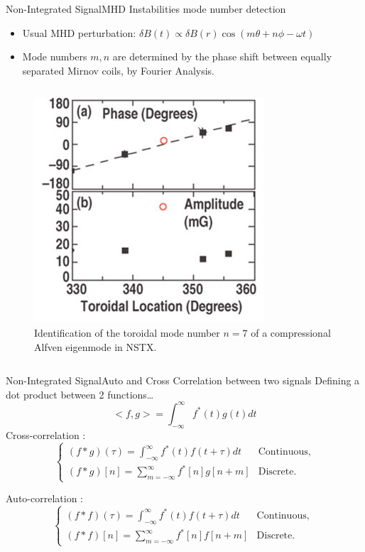 \documentclass{beamer}
\begin{document}
\begin{frame}{Non-Integrated Signal}{MHD Instabilities mode number detection}
 \begin{itemize}
	\item Usual MHD perturbation: $\delta B(t) \propto \delta B(r) \cos (m\theta + n\phi -\omega t ) $
		 \item Mode numbers {\color{red}  $m, n$}  are determined by the phase shift between equally separated Mirnov coils, by Fourier Analysis.
	 \end{itemize}
	 \begin{columns}
		 \begin{figure}[ht]
			 \begin{center}
				 \includegraphics[width=0.4 \columnwidth]{NSTX.png}
				 \caption{\tiny Identification of the toroidal mode number {\color{red}  $n=7$} of a compressional Alfven eigenmode in NSTX.}
			 \end{center}
		 \end{figure}
 	  \end{columns}
\end{frame}


\begin{frame}{Non-Integrated Signal}{Auto and Cross Correlation between two signals}
Defining a dot product between 2 functions…
$$<f,g>= \int_{-\infty}^{\infty} f^*(t) g(t) dt$$
Cross-correlation :
$$ \begin{cases}  (f \ast g) (\tau)= \int_{-\infty}^{\infty} f^*(t) f(t +\tau) dt & \text{Continuous,}\\
 (f \ast g) [n]= \sum_{m=-\infty}^{\infty} f^*[n] g[n+m]  & \text{Discrete.} \end{cases} $$

Auto-correlation :
 $$ \begin{cases} (f \ast f) (\tau)= \int_{-\infty}^{\infty} f^*(t) f(t +\tau) dt & \text{Continuous, }\\
 (f \ast f) [n]= \sum_{m=-\infty}^{\infty} f^*[n] f[n+m]  & \text{Discrete.} \end{cases} $$
\end{frame}
\end{document}
